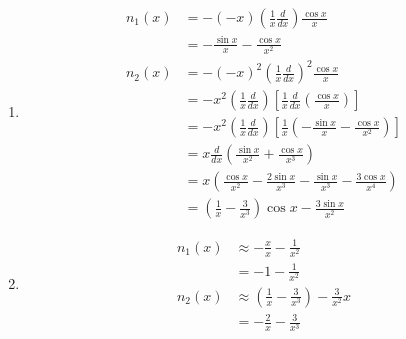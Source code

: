 \documentclass{article}
\begin{document}
\begin{enumerate}
  \item

        \begin{align*}
          n_1(x) & = -(-x) \left( \frac{1}{x} \frac{d}{d x} \right) \frac{\cos x}{x}                                                                \\
                 & = -\frac{\sin x}{x} - \frac{\cos x}{x^2}                                                                                         \\
          n_2(x) & = -(-x)^2 \left( \frac{1}{x} \frac{d}{d x} \right)^2 \frac{\cos x}{x}                                                            \\
                 & = -x^2 \left( \frac{1}{x} \frac{d}{d x} \right) \left[ \frac{1}{x} \frac{d}{d x} \left( \frac{\cos x}{x} \right) \right]         \\
                 & = -x^2 \left( \frac{1}{x} \frac{d}{d x} \right) \left[ \frac{1}{x} \left( -\frac{\sin x}{x} - \frac{\cos x}{x^2} \right) \right] \\
                 & = x \frac{d}{d x} \left( \frac{\sin x}{x^2} + \frac{\cos x}{x^3} \right)                                                         \\
                 & = x \left( \frac{\cos x}{x^2} - \frac{2 \sin x}{x^3} - \frac{\sin x}{x^3} - \frac{3 \cos x}{x^4} \right)                         \\
                 & = \left( \frac{1}{x} - \frac{3}{x^3} \right) \cos x - \frac{3 \sin x}{x^2}
        \end{align*}

  \item

        \begin{align*}
          n_1(x) & \approx -\frac{x}{x} - \frac{1}{x^2}                                 \\
                 & = -1 - \frac{1}{x^2}                                                 \\
          n_2(x) & \approx \left( \frac{1}{x} - \frac{3}{x^3} \right) - \frac{3}{x^2} x \\
                 & = -\frac{2}{x} - \frac{3}{x^3}
        \end{align*}
\end{enumerate}

\subsection{}
\end{document}
